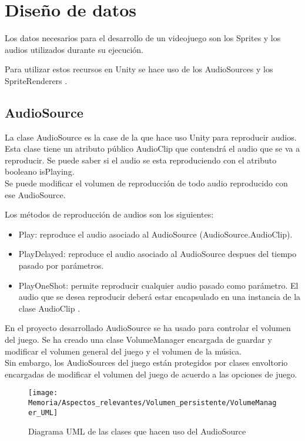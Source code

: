 \section{Diseño de datos}
Los datos necesarios para el desarrollo de un videojuego son los Sprites y los audios utilizados durante su ejecución.

Para utilizar estos recursos en Unity se hace uso de los AudioSources \cite{AudioSource} y los SpriteRenderers \cite{SpriteRenderer}.

\subsection{AudioSource}
La clase AudioSource es la case de la que hace uso Unity para reproducir audios. Esta clase tiene un atributo público AudioClip que contendrá el audio que se va a reproducir. Se puede saber si el audio se esta reproduciendo con el atributo booleano isPlaying.\\
Se puede modificar el volumen de reproducción de todo audio reproducido con ese AudioSource.

Los métodos de reproducción de audios son los siguientes:
\begin{itemize}
\item
Play: reproduce el audio asociado al AudioSource (AudioSource.AudioClip).
\item
PlayDelayed: reproduce el audio asociado al AudioSource despues del tiempo pasado por parámetros.
\item
PlayOneShot: permite reproducir cualquier audio pasado como parámetro. El audio que se desea reproducir deberá estar encapsulado en una instancia de la clase AudioClip \cite{AudioClip} .
\end{itemize}

En el proyecto desarrollado AudioSource se ha usado para controlar el volumen del juego. Se ha creado una clase VolumeManager encargada de guardar y modificar el volumen general del juego y el volumen de la música.\\
Sin embargo, los AudioSources del juego están protegidos por clases envoltorio encargadas de modificar el volumen del juego de acuerdo a las opciones de juego.

\begin{figure}[h]
\texttt{[image: Memoria/Aspectos\_relevantes/Volumen\_persistente/VolumeManager\_UML]}
\caption{Diagrama UML de las clases que hacen uso del AudioSource}
\end{figure}

